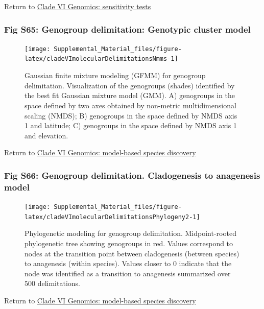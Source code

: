 \documentclass[
  11pt,
]{article}
\begin{document}
Return to \protect\hyperlink{sensitivity-tests-5}{Clade VI Genomics: sensitivity tests}
\pagebreak

\hypertarget{fig-s65-genogroup-delimitation-genotypic-cluster-model}{%
\subsubsection{Fig S65: Genogroup delimitation: Genotypic cluster model}\label{fig-s65-genogroup-delimitation-genotypic-cluster-model}}

\begin{figure}
\texttt{[image: Supplemental\_Material\_files/figure-latex/cladeVImolecularDelimitationsNmms-1]} \caption{Gaussian finite mixture modeling (GFMM) for genogroup delimitation. Visualization of the genogroups (shades) identified by the best fit Gaussian mixture model (GMM). A) genogroups in the space defined by two axes obtained by non-metric multidimensional scaling (NMDS); B) genogroups in the space defined by NMDS axis 1 and latitude; C) genogroups in the space defined by NMDS axis 1 and elevation.}\label{fig:cladeVImolecularDelimitationsNmms}
\end{figure}

Return to \protect\hyperlink{model-based-species-discovery-11}{Clade VI Genomics: model-based species discovery}
\pagebreak

\hypertarget{fig-s66-genogroup-delimitation.-cladogenesis-to-anagenesis-model}{%
\subsubsection{Fig S66: Genogroup delimitation. Cladogenesis to anagenesis model}\label{fig-s66-genogroup-delimitation.-cladogenesis-to-anagenesis-model}}

\begin{figure}
\texttt{[image: Supplemental\_Material\_files/figure-latex/cladeVImolecularDelimitationsPhylogeny2-1]} \caption{Phylogenetic modeling for genogroup delimitation. Midpoint-rooted phylogenetic tree showing genogroups in red. Values correspond to nodes at the transition point between cladogenesis (between species) to anagenesis (within species). Values closer to 0 indicate that the node was identified as a transition to anagenesis summarized over $500$ delimitations.}\label{fig:cladeVImolecularDelimitationsPhylogeny2}
\end{figure}

Return to \protect\hyperlink{model-based-species-discovery-11}{Clade VI Genomics: model-based species discovery}
\pagebreak
\end{document}
